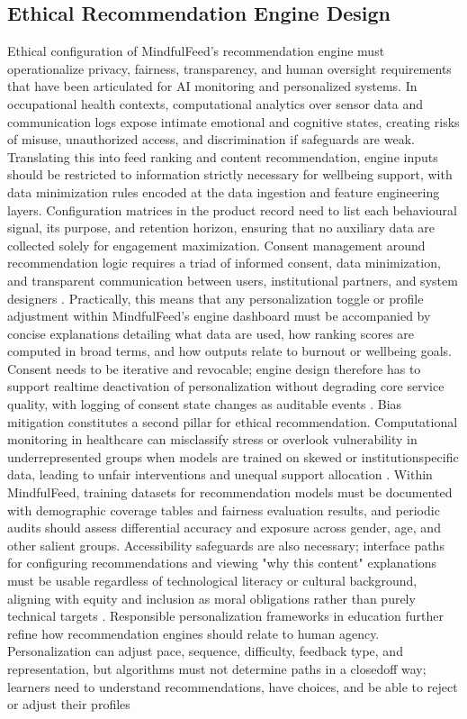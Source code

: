\documentclass{article}
\begin{document}
\subsection{Ethical Recommendation Engine Design}
\label{sec:ethical_rec_engine_design} Ethical configuration of MindfulFeed's recommendation engine must operationalize privacy, fairness, transparency, and human oversight requirements that have been articulated for AI monitoring and personalized systems. In occupational health contexts, computational analytics over sensor data and communication logs expose intimate emotional and cognitive states, creating risks of misuse, unauthorized access, and discrimination if safeguards are weak. Translating this into feed ranking and content recommendation, engine inputs should be restricted to information strictly necessary for well\-being support, with data minimization rules encoded at the data ingestion and feature engineering layers. Configuration matrices in the product record need to list each behavioural signal, its purpose, and retention horizon, ensuring that no auxiliary data are collected solely for engagement maximization. Consent management around recommendation logic requires a triad of informed consent, data minimization, and transparent communication between users, institutional partners, and system designers \parencites[18]{8760542}. Practically, this means that any personalization toggle or profile adjustment within MindfulFeed's engine dashboard must be accompanied by concise explanations detailing what data are used, how ranking scores are computed in broad terms, and how outputs relate to burnout or well\-being goals. Consent needs to be iterative and revocable; engine design therefore has to support real\-time deactivation of personalization without degrading core service quality, with logging of consent state changes as auditable events \parencites[18]{8760542}[7]{9300898}. Bias mitigation constitutes a second pillar for ethical recommendation. Computational monitoring in healthcare can misclassify stress or overlook vulnerability in underrepresented groups when models are trained on skewed or institution\-specific data, leading to unfair interventions and unequal support allocation \parencites[18]{8760542}. Within MindfulFeed, training datasets for recommendation models must be documented with demographic coverage tables and fairness evaluation results, and periodic audits should assess differential accuracy and exposure across gender, age, and other salient groups. Accessibility safeguards are also necessary; interface paths for configuring recommendations and viewing "why this content" explanations must be usable regardless of technological literacy or cultural background, aligning with equity and inclusion as moral obligations rather than purely technical targets \parencites[18]{8760542}[0180546]{0180546}. Responsible personalization frameworks in education further refine how recommendation engines should relate to human agency. Personalization can adjust pace, sequence, difficulty, feedback type, and representation, but algorithms must not determine paths in a closed\-off way; learners need to understand recommendations, have choices, and be able to reject or adjust their profiles 
\end{document}
